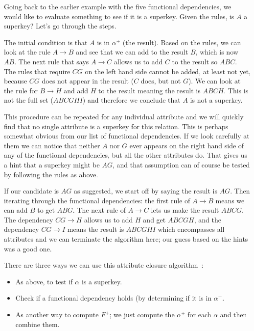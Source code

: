 Going back to the earlier example with the five functional dependencies, we would like to evaluate something to see if it is a superkey. Given the rules, is $A$ a superkey? Let's go through the steps. 

The initial condition is that $A$ is in $\alpha^{+}$ (the result). Based on the rules, we can look at the rule $A \rightarrow B$ and see that we can add to the result $B$, which is now $AB$. The next rule that says $A \rightarrow C$ allows us to add $C$ to the result so $ABC$. The rules that require $CG$ on the left hand side cannot be added, at least not yet, because $CG$ does not appear in the result ($C$ does, but not $G$). We can look at the rule for $B \rightarrow H$ and add $H$ to the result meaning the result is $ABCH$. This is not the full set ($ABCGHI$) and therefore we conclude that $A$ is not a superkey.

This procedure can be repeated for any individual attribute and we will quickly find that no single attribute is a superkey for this relation. This is perhaps somewhat obvious from our list of functional dependencies. If we look carefully at them we can notice that neither $A$ nor $G$ ever appears on the right hand side of any of the functional dependencies, but all the other attributes do. That gives us a hint that a superkey might be $AG$, and that assumption can of course be tested by following the rules as above.

If our candidate is $AG$ as suggested, we start off by saying the result is $AG$. Then  iterating through the functional dependencies: the first rule of $A \rightarrow B$ means we can add $B$ to get $ABG$. The next rule of $A \rightarrow C$ lets us make the result $ABCG$. The dependency $CG \rightarrow H$ allows us to add $H$ and get $ABCGH$, and the dependency $CG \rightarrow I$ means the result is $ABCGHI$ which encompasses all attributes and we can terminate the algorithm here; our guess based on the hints was a good one.

There are three ways we can use this attribute closure algorithm~\cite{dsc}:
\begin{itemize}
	\item As above, to test if $\alpha$ is a superkey.
	\item Check if a functional dependency holds (by determining if it is in $\alpha^{+}$.
	\item As another way to compute $F^{+}$; we just compute the $\alpha^{+}$ for each $\alpha$ and then combine them. 
\end{itemize}

